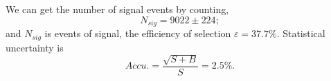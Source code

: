 \documentclass[11pt,a4paper]{cepcnote}
\begin{document}
We can get the number of signal events by counting,
\begin{equation*}
N_{sig} = 9022\pm224 ;
\end{equation*}
and $N_{sig}$ is events of signal, the efficiency of selection $\varepsilon = 37.7\%$. Statistical uncertainty is 
\begin{equation*}
Accu.=\frac{\sqrt{S+B}}{S} = 2.5\%.
\end{equation*}

%
\end{document}
